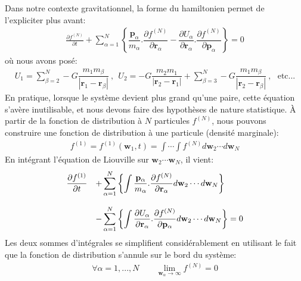 Dans notre contexte gravitationnel, la forme du hamiltonien permet de
l'expliciter plus avant:
\begin{align*}
	\frac{\partial f^{(N)}}{\partial t}+\sum_{\alpha=1}^{N}\left\{  \dfrac{\mathbf{p}_{\alpha}}{m_{\alpha}}.\dfrac{\partial f^{(N)}}{\partial
	\mathbf{r}_{\alpha}}-\dfrac{\partial U_{\alpha}}{\partial\mathbf{r}_{\alpha}}.\dfrac{\partial f^{(N)}}{\partial\mathbf{p}_{\alpha}}\right\}  =0
\end{align*}
où nous avons posé:
\begin{align*}
	U_{1}=\displaystyle\sum\limits_{\beta=2}^{N}-G\dfrac{m_{1}m_{\beta}}{\left\vert \mathbf{r}_{1}-\mathbf{r}_{\beta}\right\vert }\ ,\ \ U_{2}%
	=-G\dfrac{m_{2}m_{1}}{\left\vert \mathbf{r}_{2}-\mathbf{r}_{1}\right\vert}+\displaystyle\sum\limits_{\beta=3}^{N}-G\dfrac{m_{1}m_{\beta}}{\left\vert
	\mathbf{r}_{2}-\mathbf{r}_{\beta}\right\vert }\ ,\ \ \ \text{etc...}
\end{align*}
En pratique, lorsque le système devient plus grand qu'une paire, cette équation s'avère inutilisable, et nous devons faire des hypothèses de nature
statistique. À partir de la fonction de distribution à $N$ particules $f^{(N)}$, nous pouvons construire une fonction de distribution à une particule
(densité marginale):
\begin{align*}
	f^{(1)}=f^{(1)}(\mathbf{w}_{1},t)=\int\cdots\int f^{(N)}d\mathbf{w}_{2}\cdots d\mathbf{w}_{N}
\end{align*}
En intégrant l'équation de Liouville sur $\mathbf{w}_{2}\cdots\mathbf{w}_{N}$, il vient:
\begin{align*}%
	\begin{array}[c]{ll}%
		\dfrac{\partial f^{(1)}}{\partial t} & +\displaystyle\sum\limits_{\alpha=1}^{N}\left\{  \displaystyle\int\dfrac{\mathbf{p}_{\alpha}}{m_{\alpha}%
		}.\dfrac{\partial f^{(N)}}{\partial\mathbf{r}_{\alpha}}d\mathbf{w}_{2}\cdots d\mathbf{w}_{N}\right\} \\
		& \\
		& -\displaystyle\sum\limits_{\alpha=1}^{N}\left\{  \displaystyle\int\dfrac{\partial U_{\alpha}}{\partial\mathbf{r}_{\alpha}}.\dfrac{\partial
		f^{(N)}}{\partial\mathbf{p}_{\alpha}}d\mathbf{w}_{2}\cdots d\mathbf{w}_{N}\right\}  =0
	\end{array}
\end{align*}
Les deux sommes d'intégrales se simplifient considérablement en utilisant le fait que la fonction de distribution s'annule sur le bord du système:
\begin{align*}
	\forall\alpha=1,...,N\qquad\lim_{\mathbf{w}_{\alpha}\rightarrow\infty}f^{\left(  N\right)  }=0
\end{align*}
